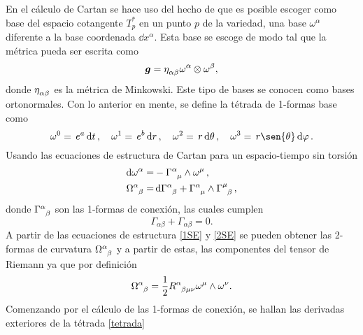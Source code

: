 En el cálculo de Cartan se hace uso del hecho de que es posible escoger como base del espacio cotangente $T^{*}_p$ en un punto $p$ de la variedad, una base $\omega^{\alpha}$ diferente a la base coordenada $\dd{x^\alpha}$. Esta base se escoge de modo tal que la métrica pueda ser escrita como 
\begin{equation}
    \bm{g}=\tensor{\eta}{_\alpha_\beta} \omega^{\alpha} \otimes \omega^{\beta},
\end{equation}
donde $\tensor{\eta}{_\alpha_\beta}$ es la métrica de Minkowski. Este tipo de bases se conocen como bases ortonormales. 
Con lo anterior en mente, se define la tétrada de 1-formas base como
\begin{equation}
    \omega^0=\,e^{a}\dd{t}, \quad
    \omega^1=\,e^{b}\dd{r}, \quad
    \omega^2=\,r\dd{\theta}, \quad
    \omega^3=\,r\sen{\theta}\dd{\varphi}.
    \label{tetrada}
\end{equation}
Usando las ecuaciones de estructura de Cartan para un espacio-tiempo sin torsión
\begin{subequations}
\begin{align}
    \dd{\omega^\alpha} =& -\tensor{\Gamma}{^\alpha_ \mu} \wedge \omega^{\mu}\,, \label{1SE}\\
    \tensor{\Omega}{^\alpha_\beta} =& \dd{ \tensor{\Gamma}{^\alpha_\beta}} + \tensor{\Gamma}{^\alpha_\mu}  \wedge \tensor{\Gamma}{^\mu_\beta}\,, \label{2SE}
\end{align}
\end{subequations}
donde $\tensor{\Gamma}{^\alpha_\beta}$ son las 1-formas de conexión, las cuales cumplen 
\begin{equation}
    \Gamma_{\alpha \beta}+\Gamma_{\alpha \beta}=0. \label{skew}
\end{equation}
A partir de las ecuaciones de estructura \eqref{1SE} y \eqref{2SE} se pueden obtener las 2-formas de curvatura $\tensor{\Omega}{^\alpha_\beta}$ y a partir de estas, las componentes del tensor de Riemann ya que por definición 
\begin{equation}
    \tensor{\Omega}{^\alpha_\beta}=\frac{1}{2}\tensor{R}{^\alpha_\beta_\mu_\nu}\omega^\mu \wedge \omega^\nu.
\end{equation}
Comenzando por el cálculo de las 1-formas de conexión, se hallan las derivadas exteriores de la tétrada \eqref{tetrada}
